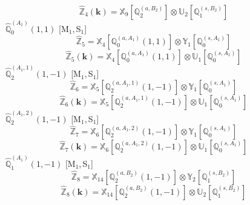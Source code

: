 \documentclass[fleqn,10pt,landscape]{article}
\begin{document}
\begin{itemize}
\begin{dmath*}
\hat{\mathbb{Z}}_{4}(\bm{k})=\mathbb{X}_{9}[\mathbb{Q}_{2}^{(a,B_{2})}] \otimes\mathbb{U}_{2}[\mathbb{Q}_{1}^{(s,B_{2})}]
\end{dmath*}
\vspace{4mm}
\noindent {} $\,\,\,\hat{\mathbb{Q}}_{0}^{(A_{1})}(1,1)$ [M$_{1}$,\,S$_{1}$]
\begin{dmath*}
\hat{\mathbb{Z}}_{5}=\mathbb{X}_{4}[\mathbb{Q}_{0}^{(a,A_{1})}(1,1)] \otimes\mathbb{Y}_{1}[\mathbb{Q}_{0}^{(s,A_{1})}]
\end{dmath*}
\begin{dmath*}
\hat{\mathbb{Z}}_{5}(\bm{k})=\mathbb{X}_{4}[\mathbb{Q}_{0}^{(a,A_{1})}(1,1)] \otimes\mathbb{U}_{1}[\mathbb{Q}_{0}^{(s,A_{1})}]
\end{dmath*}
\vspace{4mm}
\noindent {} $\,\,\,\hat{\mathbb{Q}}_{2}^{(A_{1},1)}(1,-1)$ [M$_{1}$,\,S$_{1}$]
\begin{dmath*}
\hat{\mathbb{Z}}_{6}=\mathbb{X}_{5}[\mathbb{Q}_{2}^{(a,A_{1},1)}(1,-1)] \otimes\mathbb{Y}_{1}[\mathbb{Q}_{0}^{(s,A_{1})}]
\end{dmath*}
\begin{dmath*}
\hat{\mathbb{Z}}_{6}(\bm{k})=\mathbb{X}_{5}[\mathbb{Q}_{2}^{(a,A_{1},1)}(1,-1)] \otimes\mathbb{U}_{1}[\mathbb{Q}_{0}^{(s,A_{1})}]
\end{dmath*}
\vspace{4mm}
\noindent {} $\,\,\,\hat{\mathbb{Q}}_{2}^{(A_{1},2)}(1,-1)$ [M$_{1}$,\,S$_{1}$]
\begin{dmath*}
\hat{\mathbb{Z}}_{7}=\mathbb{X}_{6}[\mathbb{Q}_{2}^{(a,A_{1},2)}(1,-1)] \otimes\mathbb{Y}_{1}[\mathbb{Q}_{0}^{(s,A_{1})}]
\end{dmath*}
\begin{dmath*}
\hat{\mathbb{Z}}_{7}(\bm{k})=\mathbb{X}_{6}[\mathbb{Q}_{2}^{(a,A_{1},2)}(1,-1)] \otimes\mathbb{U}_{1}[\mathbb{Q}_{0}^{(s,A_{1})}]
\end{dmath*}
\vspace{4mm}
\noindent {} $\,\,\,\hat{\mathbb{Q}}_{1}^{(A_{1})}(1,-1)$ [M$_{1}$,\,S$_{1}$]
\begin{dmath*}
\hat{\mathbb{Z}}_{8}=\mathbb{X}_{14}[\mathbb{Q}_{2}^{(a,B_{2})}(1,-1)] \otimes\mathbb{Y}_{2}[\mathbb{Q}_{1}^{(s,B_{2})}]
\end{dmath*}
\begin{dmath*}
\hat{\mathbb{Z}}_{8}(\bm{k})=\mathbb{X}_{14}[\mathbb{Q}_{2}^{(a,B_{2})}(1,-1)] \otimes\mathbb{U}_{2}[\mathbb{Q}_{1}^{(s,B_{2})}]
\end{dmath*}

\end{itemize}
\end{document}
